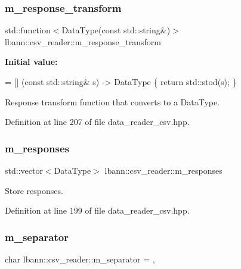\subsubsection{\texorpdfstring{m\+\_\+response\+\_\+transform}{m\_response\_transform}}
{\footnotesize\ttfamily std\+::function$<$Data\+Type(const std\+::string\&)$>$ lbann\+::csv\+\_\+reader\+::m\+\_\+response\+\_\+transform\hspace{0.3cm}{\ttfamily [protected]}}

{\bfseries Initial value\+:}
\begin{DoxyCode}
=
    [] (\textcolor{keyword}{const} std::string& s) -> DataType \{ \textcolor{keywordflow}{return} std::stod(s); \}
\end{DoxyCode}


Response transform function that converts to a Data\+Type. 



Definition at line 207 of file data\+\_\+reader\+\_\+csv.\+hpp.

\mbox{\label{classlbann_1_1csv__reader_a8b7e23827c7cbf7c8eff40cad9cb6afc}} 
\subsubsection{\texorpdfstring{m\+\_\+responses}{m\_responses}}
{\footnotesize\ttfamily std\+::vector$<$Data\+Type$>$ lbann\+::csv\+\_\+reader\+::m\+\_\+responses\hspace{0.3cm}{\ttfamily [protected]}}



Store responses. 



Definition at line 199 of file data\+\_\+reader\+\_\+csv.\+hpp.

\mbox{\label{classlbann_1_1csv__reader_abab4a731daa751856f083c117ac8862a}} 
\subsubsection{\texorpdfstring{m\+\_\+separator}{m\_separator}}
{\footnotesize\ttfamily char lbann\+::csv\+\_\+reader\+::m\+\_\+separator = \textquotesingle{},\textquotesingle{}\hspace{0.3cm}{\ttfamily [protected]}}



